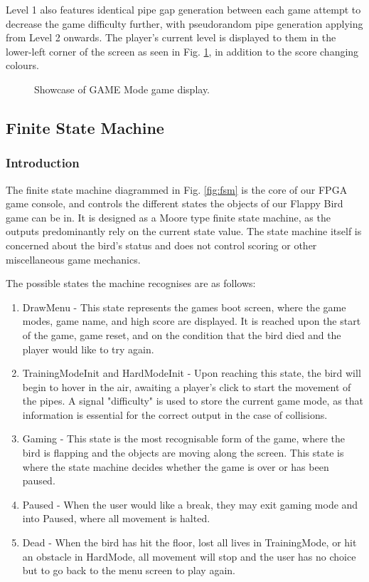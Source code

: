\documentclass[conference]{IEEEtran}
\begin{document}
Level 1 also features identical pipe gap generation between each game attempt to decrease the game difficulty further, with pseudorandom pipe generation applying from Level 2 onwards. The player's current level is displayed to them in the lower-left corner of the screen as seen in Fig. \ref{fig:game-mode}, in addition to the score changing colours.

\begin{figure}[htbp]
	\caption{Showcase of GAME Mode game display.}
	\label{fig:game-mode}
\end{figure}

\subsection{Finite State Machine}
\subsubsection{Introduction}
The finite state machine diagrammed in Fig. \ref{fig:fsm} is the core of our FPGA game console, and controls the different states the objects of our Flappy Bird game can be in. It is designed as a Moore type finite state machine, as the outputs predominantly rely on the current state value. The state machine itself is concerned about the bird's status and does not control scoring or other miscellaneous game mechanics.

The possible states the machine recognises are as follows:

\begin{enumerate}
	\item DrawMenu - This state represents the games boot screen, where the game modes, game name, and high score are displayed. It is reached upon the start of the game, game reset, and on the condition that the bird died and the player would like to try again.
	\item TrainingModeInit and HardModeInit - Upon reaching this state, the bird will begin to hover in the air, awaiting a player's click to start the movement of the pipes. A signal "difficulty" is used to store the current game mode, as that information is essential for the correct output in the case of collisions.
	\item Gaming - This state is the most recognisable form of the game, where the bird is flapping and the objects are moving along the screen. This state is where the state machine decides whether the game is over or has been paused.
	\item Paused - When the user would like a break, they may exit gaming mode and into Paused, where all movement is halted.
	\item Dead - When the bird has hit the floor, lost all lives in TrainingMode, or hit an obstacle in HardMode, all movement will stop and the user has no choice but to go back to the menu screen to play again.
\end{enumerate}
\end{document}
